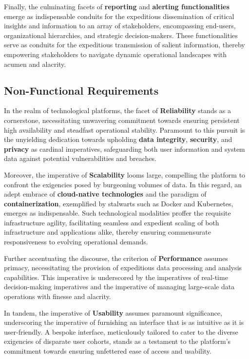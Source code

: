 Finally, the culminating facets of \textbf{reporting} and \textbf{alerting
    functionalities} emerge as indispensable conduits for the expeditious
dissemination of critical insights and information to an array of stakeholders,
encompassing end-users, organizational hierarchies, and strategic
decision-makers. These functionalities serve as conduits for the expeditious
transmission of salient information, thereby empowering stakeholders to navigate
dynamic operational landscapes with acumen and alacrity.

\subsection{Non-Functional Requirements}

In the realm of technological platforms, the facet of \textbf{Reliability}
stands as a cornerstone, necessitating unwavering commitment towards ensuring
persistent high availability and steadfast operational stability. Paramount to
this pursuit is the unyielding dedication towards upholding \textbf{data
    integrity}, \textbf{security}, and \textbf{privacy} as cardinal imperatives,
safeguarding both user information and system data against potential
vulnerabilities and breaches.

Moreover, the imperative of \textbf{Scalability} looms large, compelling the
platform to confront the exigencies posed by burgeoning volumes of data. In this
regard, an adept embrace of \textbf{cloud-native technologies} and the paradigm
of \textbf{containerization}, exemplified by stalwarts such as Docker and
Kubernetes, emerges as indispensable. Such technological modalities proffer the
requisite infrastructure agility, facilitating seamless and expedient scaling of
both infrastructure and applications alike, thereby ensuring commensurate
responsiveness to evolving operational demands.

Further accentuating the discourse, the criterion of \textbf{Performance}
assumes primacy, necessitating the provision of expeditious data processing and
analysis capabilities. This imperative is underscored by the imperatives of
real-time decision-making imperatives and the imperative of managing large-scale
data operations with finesse and alacrity.

In tandem, the imperative of \textbf{Usability} assumes paramount significance,
underscoring the imperative of furnishing an interface that is as intuitive as
it is user-friendly. A bespoke interface, meticulously tailored to cater to the
diverse exigencies of disparate user cohorts, stands as a testament to the
platform's commitment towards ensuring unfettered ease of access and usability.

